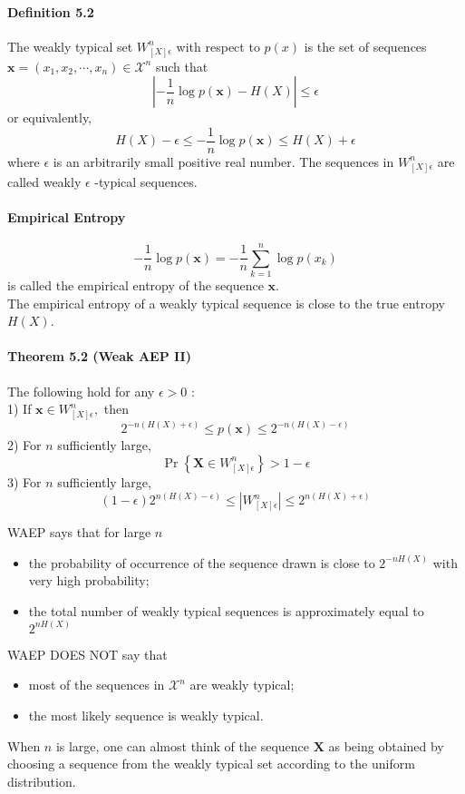 \documentclass[8pt]{article}
\begin{document}
\paragraph{Definition 5.2} The weakly typical set $W_{[X] \epsilon}^{n}$ with respect to $p(x)$ is the set of sequences $\mathbf{x}=\left(x_{1}, x_{2}, \cdots, x_{n}\right) \in \mathcal{X}^{n}$ such that
$$
\left|-\frac{1}{n} \log p(\mathbf{x})-H(X)\right| \leq \epsilon
$$
or equivalently,
$$
H(X)-\epsilon \leq-\frac{1}{n} \log p(\mathbf{x}) \leq H(X)+\epsilon
$$
where $\epsilon$ is an arbitrarily small positive real number. The sequences in $W_{[X] \epsilon}^{n}$ are called weakly $\epsilon$ -typical sequences.

\paragraph{Empirical Entropy}
$$
-\frac{1}{n} \log p(\mathbf{x})=-\frac{1}{n} \sum_{k=1}^{n} \log p\left(x_{k}\right)
$$
is called the empirical entropy of the sequence $\mathbf{x}$. \\
The empirical entropy of a weakly typical sequence is close to the true entropy $H(X)$.

\paragraph{Theorem 5.2 (Weak AEP II)} The following hold for any $\epsilon>0$ :\\
1) If $\mathbf{x} \in W_{[X] \epsilon}^{n},$ then
$$
2^{-n(H(X)+\epsilon)} \leq p(\mathbf{x}) \leq 2^{-n(H(X)-\epsilon)}
$$
2) For $n$ sufficiently large,
$$
\operatorname{Pr}\left\{\mathbf{X} \in W_{[X] \epsilon}^{n}\right\}>1-\epsilon
$$
3) For $n$ sufficiently large,
$$
(1-\epsilon) 2^{n(H(X)-\epsilon)} \leq\left|W_{[X] \epsilon}^{n}\right| \leq 2^{n(H(X)+\epsilon)}
$$

\noindent WAEP says that for large $n$
\begin{itemize}
	\item the probability of occurrence of the sequence drawn is close to $2^{-n H(X)}$ with very high probability;
	\item the total number of weakly typical sequences is approximately equal to $2^{n H(X)}$
\end{itemize}
\noindent WAEP DOES NOT say that
\begin{itemize}
	\item most of the sequences in $\mathcal{X}^{n}$ are weakly typical;
	\item the most likely sequence is weakly typical.
\end{itemize}
When $n$ is large, one can almost think of the sequence $\mathbf{X}$ as being obtained by choosing a sequence from the weakly typical set according to the uniform distribution.
\end{document}
